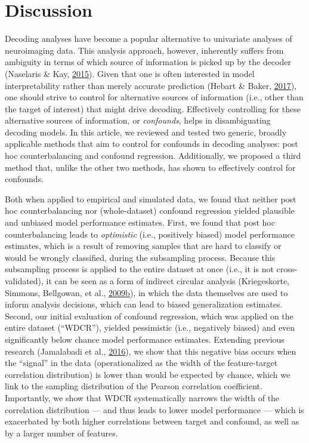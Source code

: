 \documentclass[11pt,american,]{memoir} %
\begin{document}
\hypertarget{confounds-decoding-discussion}{%
\section{Discussion}\label{confounds-decoding-discussion}}

Decoding analyses have become a popular alternative to univariate analyses of neuroimaging data. This analysis approach, however, inherently suffers from ambiguity in terms of which source of information is picked up by the decoder (Naselaris \& Kay, \protect\hyperlink{ref-Naselaris2015-jn}{2015}). Given that one is often interested in model interpretability rather than merely accurate prediction (Hebart \& Baker, \protect\hyperlink{ref-Hebart2017-jn}{2017}), one should strive to control for alternative sources of information (i.e., other than the target of interest) that might drive decoding. Effectively controlling for these alternative sources of information, or \emph{confounds}, helps in disambiguating decoding models. In this article, we reviewed and tested two generic, broadly applicable methods that aim to control for confounds in decoding analyses: post hoc counterbalancing and confound regression. Additionally, we proposed a third method that, unlike the other two methods, has shown to effectively control for confounds.

Both when applied to empirical and simulated data, we found that neither post hoc counterbalancing nor (whole-dataset) confound regression yielded plausible and unbiased model performance estimates. First, we found that post hoc counterbalancing leads to \emph{optimistic} (i.e., positively biased) model performance estimates, which is a result of removing samples that are hard to classify or would be wrongly classified, during the subsampling process. Because this subsampling process is applied to the entire dataset at once (i.e., it is not cross-validated), it can be seen as a form of indirect circular analysis (Kriegeskorte, Simmons, Bellgowan, et al., \protect\hyperlink{ref-Kriegeskorte2009-yz}{2009}\protect\hyperlink{ref-Kriegeskorte2009-yz}{b}), in which the data themselves are used to inform analysis decisions, which can lead to biased generalization estimates. Second, our initial evaluation of confound regression, which was applied on the entire dataset (``WDCR''), yielded pessimistic (i.e., negatively biased) and even significantly below chance model performance estimates. Extending previous research (Jamalabadi et al., \protect\hyperlink{ref-jamalabadi2016classification}{2016}), we show that this negative bias occurs when the ``signal'' in the data (operationalized as the width of the feature-target correlation distribution) is lower than would be expected by chance, which we link to the sampling distribution of the Pearson correlation coefficient. Importantly, we show that WDCR systematically narrows the width of the correlation distribution --- and thus leads to lower model performance --- which is exacerbated by both higher correlations between target and confound, as well as by a larger number of features.
\end{document}
